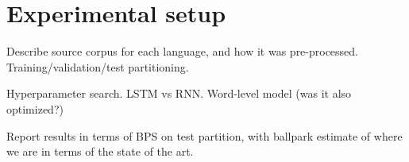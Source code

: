 \section{Experimental setup}
\label{sec:setup}

Describe source corpus for each language, and how it was
pre-processed. Training/validation/test partitioning.

Hyperparameter search. LSTM vs RNN. Word-level model (was it also
optimized?)

Report results in terms of BPS on test partition, with ballpark
estimate of where we are in terms of the state of the art.


